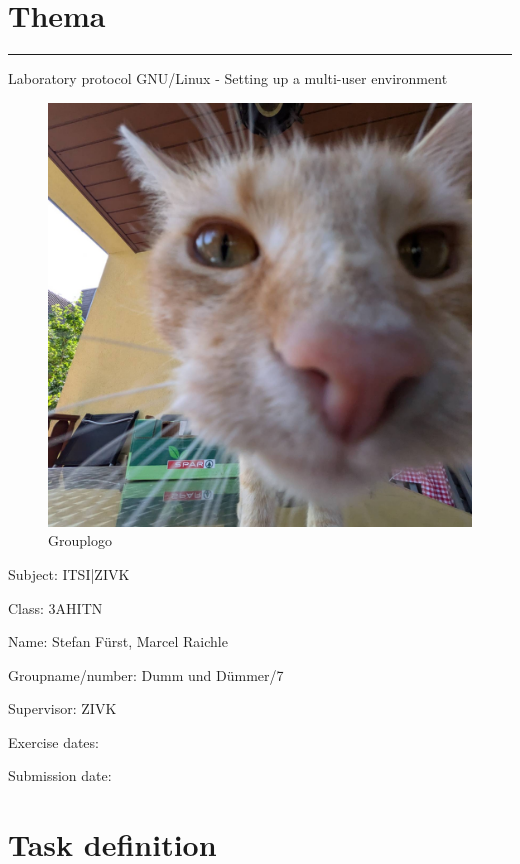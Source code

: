 \documentclass[a4paper]{article}
\begin{document}

\pagestyle{oida}
\section*{Thema}
\par\noindent\rule{\textwidth}{0.4pt}

Laboratory protocol
GNU/Linux - Setting up a multi-user environment

\begin{figure}[h]
	\includegraphics[scale=0.3]{images/mika.jpeg}
	\caption{Grouplogo}
\end{figure}

\vspace*{\fill}
Subject:	ITSI|ZIVK

Class:	3AHITN

Name:	Stefan Fürst, Marcel Raichle

Groupname/number: Dumm und Dümmer/7

Supervisor: 	ZIVK

Exercise dates:	

Submission date:


\newpage
\tableofcontents

\newpage

\section{Task definition}
\end{document}
